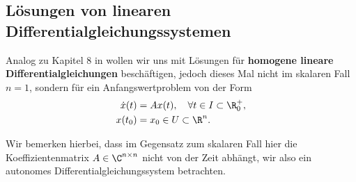 \documentclass[letterpaper,10pt,english]{jupyterBook}
\begin{document}
\subsection{Lösungen von linearen Differentialgleichungssystemen}
\label{\detokenize{ode/repetition:losungen-von-linearen-differentialgleichungssystemen}}\label{\detokenize{ode/repetition:s-lineare-dglsysteme}}
\par
Analog zu Kapitel 8 in \cite{Ten21} wollen wir uns mit Lösungen für \textbf{homogene lineare Differentialgleichungen} beschäftigen, jedoch dieses Mal nicht im skalaren Fall \(n=1\), sondern für ein Anfangswertproblem von der Form
\begin{align}\label{equation:ode/repetition:eq:linhomdglsystem}
\dot{x}(t) &= A x(t), \quad \forall t \in I \subset \R^+_0, \\
x(t_0) &= x_0 \in U \subset \R^n.
\end{align}
\par
Wir bemerken hierbei, dass im Gegensatz zum skalaren Fall hier die Koeffizientenmatrix \(A \in \C^{n\times n}\) nicht von der Zeit abhängt, wir also ein autonomes Differentialgleichungssystem betrachten.
\end{document}
